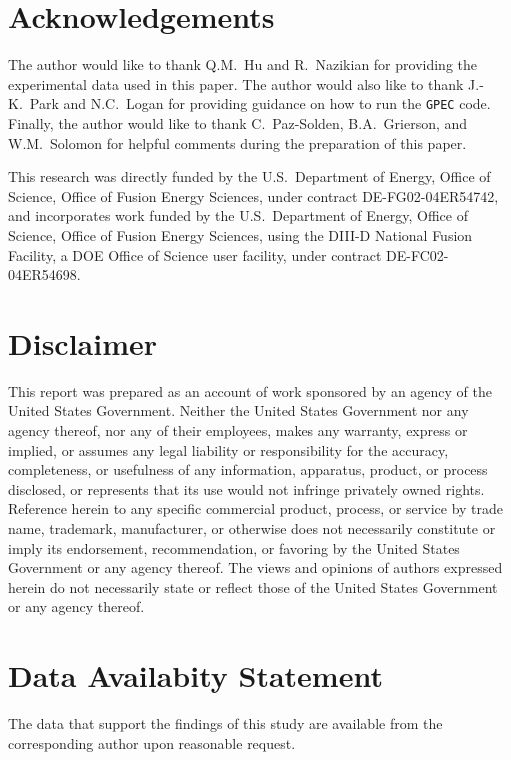 \documentclass[12pt,prb,aps]{revtex4-1}
\providecommand{\DIFaddend}{} %
\begin{document}
\DIFaddend \section*{Acknowledgements}
The author would like to thank Q.M.~Hu and R.~Nazikian for providing the experimental data used in this paper. The
author would also like to thank J.-K.~Park and N.C.~Logan for providing guidance on how to run the {\tt GPEC} code. Finally, the
author would like to thank C.~Paz-Solden, B.A.~Grierson, and W.M.~Solomon for helpful comments during the preparation of this paper. 

This research was directly funded by the U.S.\ Department of Energy, Office of Science, Office of Fusion Energy Sciences,  under contract DE-FG02-04ER54742, and
incorporates work funded by the U.S.\ Department of Energy, Office of Science, Office of Fusion Energy Sciences, using the DIII-D National Fusion Facility, a DOE Office of Science user facility, under contract DE-FC02-04ER54698.  

\section*{Disclaimer} This report was prepared as an account of work sponsored by an agency of the United States Government. Neither the United States Government nor any agency thereof, nor any of their employees, makes any warranty, express or implied, or assumes any legal liability or responsibility for the accuracy, completeness, or usefulness of any information, apparatus, product, or process disclosed, or represents that its use would not infringe privately owned rights. Reference herein to any specific commercial product, process, or service by trade name, trademark, manufacturer, or otherwise does not necessarily constitute or imply its endorsement, recommendation, or favoring by the United States Government or any agency thereof. The views and opinions of authors expressed herein do not necessarily state or reflect those of the United States Government or any agency thereof. 

\section*{Data Availabity Statement}
The data that support the findings of this study are available from the corresponding author upon reasonable request.
\end{document}
